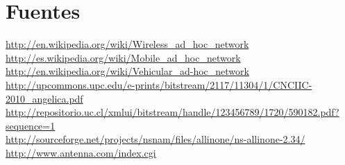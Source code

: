 \documentclass[12pt]{article}
\begin{document}
\newpage

%
\section{Fuentes}
\url{http://en.wikipedia.org/wiki/Wireless_ad_hoc_network}\\

\url{http://es.wikipedia.org/wiki/Mobile_ad_hoc_network}\\

\url{http://en.wikipedia.org/wiki/Vehicular_ad-hoc_network}\\

\url{http://upcommons.upc.edu/e-prints/bitstream/2117/11304/1/CNCIIC-2010_angelica.pdf}\\

\url{http://repositorio.uc.cl/xmlui/bitstream/handle/123456789/1720/590182.pdf?sequence=1}\\

\url{http://sourceforge.net/projects/nsnam/files/allinone/ns-allinone-2.34/}\\

\url{http://www.antenna.com/index.cgi}\\

\end{document}
